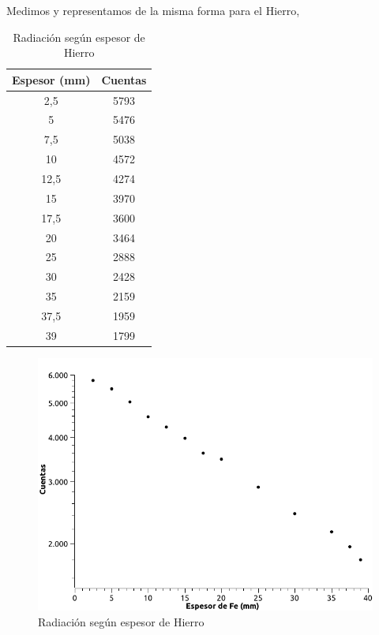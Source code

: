 \documentclass[a4paper,12pt,spanish]{article}
\begin{document}
	
	Medimos y representamos de la misma forma para el Hierro, 
	
	
	\begin{table}[H]
		\centering
		\begin{tabular}{|c|c|}
			\hline
			Espesor (mm) & Cuentas \\ \hline
			2,5          & 5793    \\ \hline
			5            & 5476    \\ \hline
			7,5          & 5038    \\ \hline
			10           & 4572    \\ \hline
			12,5         & 4274    \\ \hline
			15           & 3970    \\ \hline
			17,5         & 3600    \\ \hline
			20           & 3464    \\ \hline
			25           & 2888    \\ \hline
			30           & 2428    \\ \hline
			35           & 2159    \\ \hline
			37,5         & 1959    \\ \hline
			39           & 1799    \\ \hline
		\end{tabular}
		\caption{Radiación según espesor de Hierro}
	\end{table}






\begin{figure}[H]
	\centering
	\includegraphics[width=0.9\linewidth]{images/graficas_practica_4/hierro_cuentas}
	\caption{Radiación según espesor de Hierro}
	\label{fig:hierrocuentas}
\end{figure}
	
\end{document}
